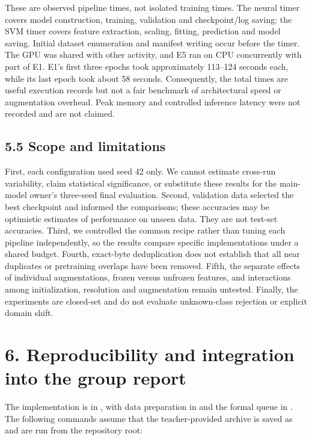 \documentclass[
  10pt,
  a4paper,
]{article}
\begin{document}
These are observed pipeline times, not isolated training times. The
neural timer covers model construction, training, validation and
checkpoint/log saving; the SVM timer covers feature extraction, scaling,
fitting, prediction and model saving. Initial dataset enumeration and
manifest writing occur before the timer. The GPU was shared with other
activity, and E5 ran on CPU concurrently with part of E1. E1's first
three epochs took approximately 113--124 seconds each, while its last
epoch took about 58 seconds. Consequently, the total times are useful
execution records but not a fair benchmark of architectural speed or
augmentation overhead. Peak memory and controlled inference latency were
not recorded and are not claimed.

\subsection{5.5 Scope and limitations}\label{scope-and-limitations}

First, each configuration used seed 42 only. We cannot estimate
cross-run variability, claim statistical significance, or substitute
these results for the main-model owner's three-seed final evaluation.
Second, validation data selected the best checkpoint and informed the
comparisons; these accuracies may be optimistic estimates of performance
on unseen data. They are not test-set accuracies. Third, we controlled
the common recipe rather than tuning each pipeline independently, so the
results compare specific implementations under a shared budget. Fourth,
exact-byte deduplication does not establish that all near duplicates or
pretraining overlaps have been removed. Fifth, the separate effects of
individual augmentations, frozen versus unfrozen features, and
interactions among initialization, resolution and augmentation remain
untested. Finally, the experiments are closed-set and do not evaluate
unknown-class rejection or explicit domain shift.

\section{6. Reproducibility and integration into the group
report}\label{reproducibility-and-integration-into-the-group-report}

The implementation is in , with data
preparation in  and the formal queue in
. The following commands assume that the
teacher-provided archive is saved as  and are
run from the repository root:
\end{document}
